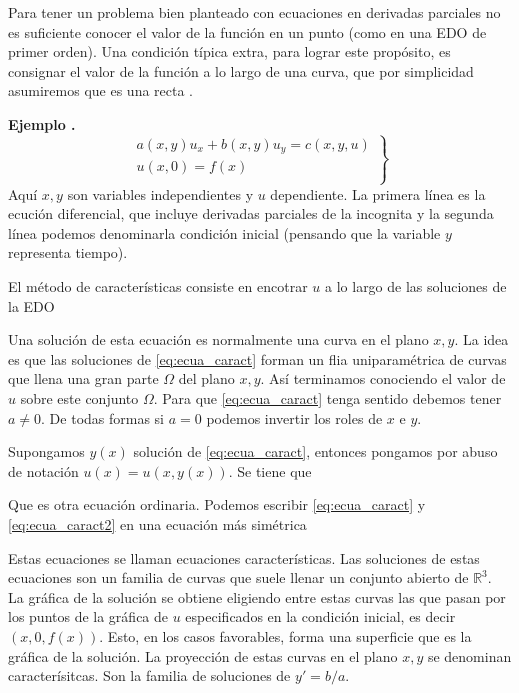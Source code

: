 \documentclass{article}
\renewcommand{\emph}[1]{\textcolor[rgb]{1,0,0}{#1}}
\newcounter{ejemplo_cont}
\newenvironment{ejemplo}{\noindent\textbf{Ejemplo  \arabic{ejemplo_cont}.} }{\addtocounter{ejemplo_cont}{1}}
\begin{document}
Para tener un problema bien planteado con  ecuaciones en derivadas parciales no es suficiente conocer el valor de la función en un punto (como en una EDO de primer orden). Una condición típica extra, para lograr este propósito,  es consignar el valor de la función a lo largo de una curva, que por simplicidad asumiremos que es una recta .

\begin{ejemplo}
\begin{equation}\label{eq:EDP_gral_1orden}
  \left.\begin{array}{l}
  a(x,y)u_x+b(x,y)u_y=c(x,y,u)\\
  u(x,0)=f(x)\\
\end{array}\right\}
\end{equation}
Aquí $x,y$ son variables independientes y $u$ dependiente. La primera línea es la ecución diferencial, que incluye derivadas parciales de la incognita y la segunda línea podemos denominarla condición inicial (pensando que la variable $y$ representa tiempo).
\end{ejemplo}

El método de características consiste en encotrar $u$ a lo largo de las soluciones de la EDO


Una solución de esta ecuación es normalmente una curva en el plano  $x,y$. La idea es que las soluciones de \eqref{eq:ecua_caract} forman un flia uniparamétrica
 de curvas que llena una gran parte $\Omega$ del plano $x,y$.  Así terminamos conociendo el valor de $u$ sobre este conjunto $\Omega$. Para que \eqref{eq:ecua_caract} tenga sentido debemos tener $a\neq 0$. De todas formas si $a=0$ podemos invertir los roles de $x$ e $y$.

Supongamos $y(x)$ solución de \eqref{eq:ecua_caract}, entonces pongamos por abuso de notación $u(x)=u(x,y(x))$. Se tiene que

Que es otra ecuación ordinaria. Podemos escribir  \eqref{eq:ecua_caract} y \eqref{eq:ecua_caract2} en una ecuación más simétrica

Estas ecuaciones se llaman \emph{ecuaciones características}. Las soluciones de estas ecuaciones son un familia de curvas que suele llenar un conjunto abierto de  $\mathbb{R}^3$.  La gráfica de la solución se obtiene eligiendo entre estas curvas las que pasan por los puntos de la gráfica de $u$ especificados en la condición inicial, es decir $(x,0,f(x))$. Esto, en los casos favorables, forma una superficie que es la gráfica de la solución. La proyección de estas curvas en el plano $x,y$ se denominan \emph{caracterísitcas}. Son la familia de soluciones de $y'=b/a$.
\end{document}
